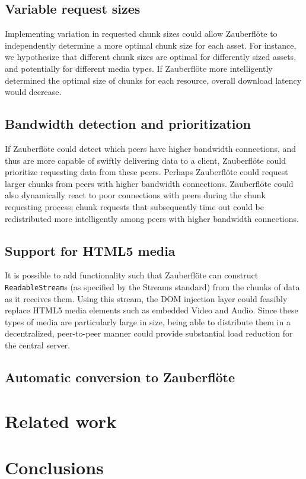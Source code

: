 \documentclass[letterpaper,twocolumn,10pt]{article}
\newcommand{\zbf}{Zauberfl\"{o}te\xspace}
\begin{document}
\subsection{Variable request sizes}

Implementing variation in requested chunk sizes could allow \zbf to independently
determine a more optimal chunk size for each asset. For instance, we hypothesize
that different chunk sizes are optimal for differently sized assets, and potentially
for different media types. If \zbf more intelligently determined the optimal size
of chunks for each resource, overall download latency would decrease.

\subsection{Bandwidth detection and prioritization}

If \zbf could detect which peers have higher bandwidth connections, and thus
are more capable of swiftly delivering data to a client, \zbf could prioritize
requesting data from these peers. Perhaps \zbf could request larger chunks from
peers with higher bandwidth connections. \zbf could also dynamically react to
poor connections with peers during the chunk requesting process; chunk requests
that subsequently time out could be redistributed more intelligently among
peers with higher bandwidth connections.

\subsection{Support for HTML5 media}
It is possible to add functionality such that \zbf can construct \texttt{ReadableStream}s (as specified by the Streams standard) %
from the chunks of data as it receives them. Using this stream, the DOM injection layer could feasibly replace HTML5 media elements such as embedded Video and Audio. Since these types of media are particularly large in size, being able to distribute them in a decentralized, peer-to-peer manner could provide substantial load reduction for the central server.

\subsection{Automatic conversion to \zbf}

\section{Related work}


\section{Conclusions}



{\footnotesize 
}
\end{document}
